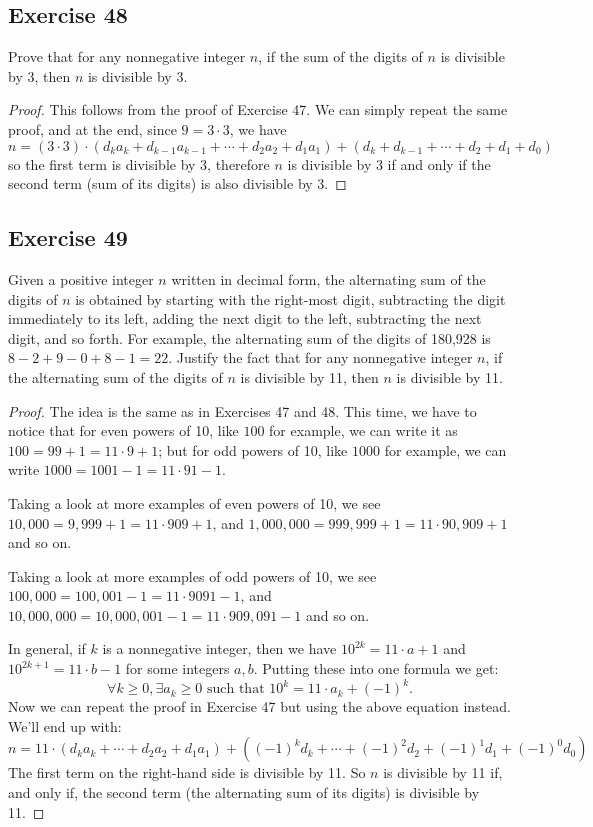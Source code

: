 \documentclass[14pt]{extarticle}
\newcommand{\fa}{\forall}
\newcommand{\te}{\exists}
\begin{document}
\subsection{Exercise 48}
Prove that for any nonnegative integer $n$, if the sum of the digits of $n$ is divisible by 3, then $n$ is divisible by 3.

\begin{proof}
This follows from the proof of Exercise 47. We can simply repeat the same proof, and at the end, since $9 = 3 \cdot 3$, we have
\[
n = (3 \cdot 3) \cdot(d_ka_k + d_{k-1}a_{k-1} + \cdots + d_2 a_2 + d_1a_1) + (d_k + d_{k-1} + \cdots + d_2 + d_1 + d_0)
\]
so the first term is divisible by 3, therefore $n$ is divisible by 3 if and only if the second term (sum of its digits) is also divisible by 3.
\end{proof}

\subsection{Exercise 49}
Given a positive integer $n$ written in decimal form, the alternating sum of the digits of $n$ is obtained by starting with the right-most digit, subtracting the digit immediately to its left, adding the next digit to the left, subtracting the next digit, and so forth. For example, the alternating sum of the digits of 180,928 is $8 - 2 + 9 - 0 + 8 - 1 = 22$. Justify the fact that for any nonnegative integer $n$, if the alternating sum of the digits of $n$ is divisible by 11, then $n$ is divisible by 11.

\begin{proof}
The idea is the same as in Exercises 47 and 48. This time, we have to notice that for even powers of 10, like $100$ for example, we can write it as $100 = 99 + 1 = 11 \cdot 9 + 1$; but for odd powers of 10, like $1000$ for example, we can write $1000 = 1001 - 1 = 11 \cdot 91 - 1$.

Taking a look at more examples of even powers of 10, we see $10,000 = 9,999 + 1 = 11 \cdot 909 + 1$, and $1,000,000 = 999,999 + 1 = 11 \cdot 90,909 + 1$ and so on.

Taking a look at more examples of odd powers of 10, we see $100,000 = 100,001 - 1 = 11 \cdot 9091 - 1$, and $10,000,000 = 10,000,001 - 1 = 11 \cdot 909,091 - 1$ and so on.

In general, if $k$ is a nonnegative integer, then we have $10^{2k} = 11 \cdot a + 1$ and $10^{2k+1} = 11 \cdot b - 1$ for some integers $a, b$. Putting these into one formula we get:
\[
\fa k \geq 0, \te a_k \geq 0 \text{ such that } 10^{k} = 11 \cdot a_k + (-1)^k.
\]
Now we can repeat the proof in Exercise 47 but using the above equation instead. We'll end up with:
\[
n = 11 \cdot(d_ka_k +\cdots + d_2 a_2 + d_1a_1) + ((-1)^{k}d_k +  \cdots + (-1)^{2}d_2 + (-1)^{1}d_1 + (-1)^{0}d_0)
\]
The first term on the right-hand side is divisible by 11. So $n$ is divisible by 11 if, and only if, the second term (the alternating sum of its digits) is divisible by 11.
\end{proof}
\end{document}
